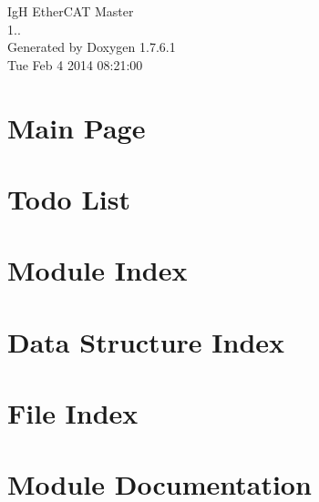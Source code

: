 \documentclass[a4paper]{book}
\begin{document}
\begin{titlepage}
\vspace*{7cm}
\begin{center}
{\Large \-Ig\-H \-Ether\-C\-A\-T \-Master \\[1ex]\large 1.. }\\
\vspace*{1cm}
{\large \-Generated by Doxygen 1.7.6.1}\\
\vspace*{0.5cm}
{\small Tue Feb 4 2014 08:21:00}\\
\end{center}
\end{titlepage}
\clearemptydoublepage
{}
\tableofcontents
\clearemptydoublepage
{}
\chapter{\-Main \-Page}
\label{index}
\chapter{\-Todo \-List}
\label{todo}

\chapter{\-Module \-Index}

\chapter{\-Data \-Structure \-Index}

\chapter{\-File \-Index}

\chapter{\-Module \-Documentation}



\end{document}

